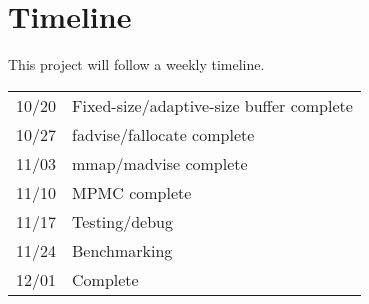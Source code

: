 \documentclass[12pt]{article}
\begin{document}
\section{Timeline}
This project will follow a weekly timeline. \\
\begin{tabular}{|l | l|}
\hline
10/20 & Fixed-size/adaptive-size buffer complete \\
10/27 & fadvise/fallocate complete \\
11/03 & mmap/madvise complete \\
11/10 & MPMC complete \\
11/17 & Testing/debug \\
11/24 & Benchmarking \\
12/01 & Complete \\
\hline
\end{tabular}



\end{document}
